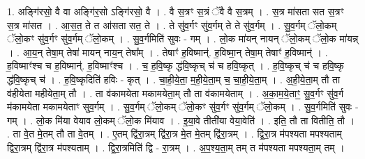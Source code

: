 \documentclass[17pt]{extarticle}
\begin{document}
1. अङ्गि॑रसो॒ वै वा अङ्गि॑र॒सो ऽङ्गि॑रसो॒ वै । . वै स॒त्रꣳ स॒त्रं ॅवै वै स॒त्रम् । . स॒त्र मा॑सता सत स॒त्रꣳ स॒त्र मा॑सत । . आ॒स॒त॒ ते त आ॑सता सत॒ ते । . ते सु॑व॒र्गꣳ सु॑व॒र्गम् ते ते सु॑व॒र्गम् । . सु॒व॒र्गम् ॅलो॒कम् ॅलो॒कꣳ सु॑व॒र्गꣳ सु॑व॒र्गम् ॅलो॒कम् । . सु॒व॒र्गमिति॑ सुवः - गम् । . लो॒क मा॑यन् नायन् ॅलो॒कम् ॅलो॒क मा॑यन्न् । . आ॒य॒न् तेषा॒म् तेषा॑ मायन् नाय॒न् तेषा᳚म् । . तेषाꣳ॑ ह॒विष्मान्॑. ह॒विष्मा॒न् तेषा॒म् तेषाꣳ॑ ह॒विष्मान्॑ । . ह॒विष्माꣳ॑श्च च ह॒विष्मान्॑. ह॒विष्माꣳ॑श्च । . च॒ ह॒वि॒ष्कृ द्ध॑वि॒ष्कृच् च॑ च हवि॒ष्कृत् । . ह॒वि॒ष्कृच् च॑ च हवि॒ष्कृ द्ध॑वि॒ष्कृच् च॑ । . ह॒वि॒ष्कृदिति॑ हविः - कृत् । . चा॒ही॒ये॒ता॒ म॒ही॒ये॒ता॒म् च॒ चा॒ही॒ये॒ता॒म् । . अ॒ही॒ये॒ता॒म् तौ ता व॑हीयेता महीयेता॒म् तौ । . ता व॑कामयेता मकामयेता॒म् तौ ता व॑कामयेताम् । . अ॒का॒म॒ये॒ताꣳ॒॒ सु॒व॒र्गꣳ सु॑व॒र्ग म॑कामयेता मकामयेताꣳ सुव॒र्गम् । . सु॒व॒र्गम् ॅलो॒कम् ॅलो॒कꣳ सु॑व॒र्गꣳ सु॑व॒र्गम् ॅलो॒कम् । . सु॒व॒र्गमिति॑ सुवः - गम् । . लो॒क मि॑या वेयाव लो॒कम् ॅलो॒क मि॑याव । . इ॒या॒वे तीती॑या वेया॒वेति॑ । . इति॒ तौ ता वितीति॒ तौ । . ता वे॒त मे॒तम् तौ ता वे॒तम् । . ए॒तम् द्वि॑रा॒त्रम् द्वि॑रा॒त्र मे॒त मे॒तम् द्वि॑रा॒त्रम् । . द्वि॒रा॒त्र म॑पश्यता मपश्यताम् द्विरा॒त्रम् द्वि॑रा॒त्र म॑पश्यताम् । . द्वि॒रा॒त्रमिति॑ द्वि - रा॒त्रम् । . अ॒प॒श्य॒ता॒म् तम् त म॑पश्यता मपश्यता॒म् तम् । \newline
\end{document}
